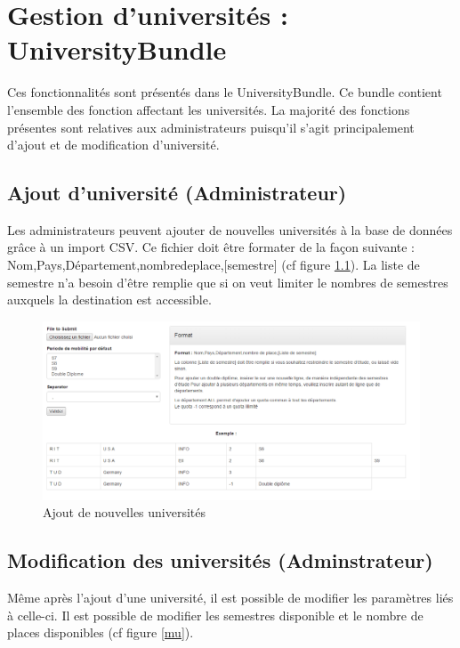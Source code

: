 \chapter{Gestion d'universités : UniversityBundle}

Ces fonctionnalités sont présentés dans le UniversityBundle. Ce bundle contient l'ensemble des fonction affectant les universités. La majorité des fonctions présentes sont relatives aux administrateurs puisqu'il s'agit principalement d'ajout et de modification d'université.

\section{Ajout d'université (Administrateur)}

Les administrateurs peuvent ajouter de nouvelles universités à la base de données grâce à un import CSV. Ce fichier doit être formater de la façon suivante : Nom,Pays,Département,nombredeplace,[semestre] (cf figure \ref{au}).
\smallbreak
La liste de semestre n'a besoin d'être remplie que si on veut limiter le nombres de semestres auxquels la destination est accessible.

\begin{figure}[H]
	\centering
	\includegraphics[scale=0.35]{images/au.png}
	\caption{Ajout de nouvelles universités}
	\label{au}
\end{figure}

\section{Modification des universités (Adminstrateur)}

Même après l'ajout d'une université, il est possible de modifier les paramètres liés à celle-ci. Il est possible de modifier les semestres disponible et le nombre de places disponibles (cf figure \ref{mu}).


